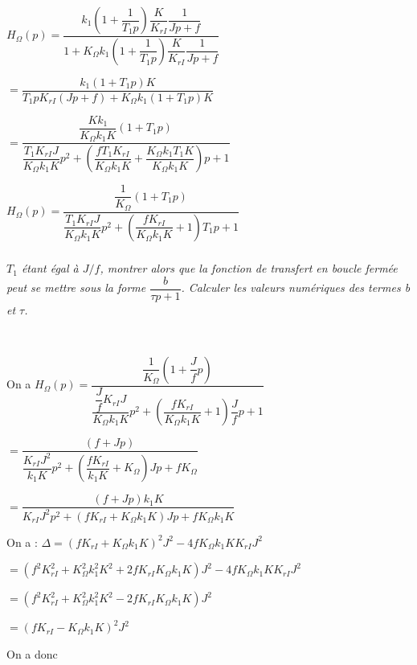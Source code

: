 \documentclass[10pt,fleqn]{article} %
\begin{document}
\begin{multicols}{2}
\ifprof
\begin{corrige}
$H_{\Omega}(p)=\dfrac{k_{1}\left( 1 + \dfrac{1}{T_{1}p} \right)\dfrac{K}{K_{rI}}\dfrac{1}{Jp+f}}{1+ K_{\Omega}k_{1}\left( 1 +\dfrac{1}{T_{1}p} \right)\dfrac{K}{K_{rI}}\dfrac{1}{Jp+f}}$

$=\dfrac{k_{1}\left( 1 + T_{1}p \right)K}{T_{1}p K_{rI}\left(Jp+f\right) + K_{\Omega}k_{1}\left(1+ T_{1}p\right) K}$

$=\dfrac{\dfrac{Kk_{1}}{K_{\Omega}k_{1}K}\left( 1 + T_{1}p \right)}{\dfrac{T_{1} K_{rI}J}{K_{\Omega}k_{1}K}p^2+\left(\dfrac{fT_{1} K_{rI}}{K_{\Omega}k_{1}K}+\dfrac{K_{\Omega}k_{1}T_{1}K}{K_{\Omega}k_{1}K}\right)p + 1 }$


$H_{\Omega}(p)=\dfrac{\dfrac{1}{K_{\Omega}}\left( 1 + T_{1}p \right)}{\dfrac{T_{1} K_{rI}J}{K_{\Omega}k_{1}K}p^2+\left(\dfrac{f K_{rI}}{K_{\Omega}k_{1}K}+1\right)T_{1}p + 1 }$

\end{corrige}
\else
\fi

\subparagraph{}\textit{$T_1$ étant égal à $J/f$, montrer alors que
  la fonction de transfert en boucle fermée peut se mettre sous la forme
  \(\dfrac{b}{\tau p + 1}\). Calculer les valeurs numériques des termes
  \emph{b} et \emph{$\tau$}.}

\ifprof
\begin{corrige}~\\

\footnotesize

On a 
$H_{\Omega}(p)=\dfrac{\dfrac{1}{K_{\Omega}}\left( 1 + \dfrac{J}{f}p \right)}{\dfrac{\dfrac{J}{f} K_{rI}J}{K_{\Omega}k_{1}K}p^2+\left(\dfrac{f K_{rI}}{K_{\Omega}k_{1}K}+1\right)\dfrac{J}{f}p + 1 }$

$=\dfrac{\left( f + Jp \right)}{\dfrac{ K_{rI}J^2}{k_{1}K}p^2+\left(\dfrac{f K_{rI}}{k_{1}K}+K_{\Omega}\right)Jp + fK_{\Omega}}$

$=\dfrac{\left( f + Jp \right)k_{1}K}{ K_{rI}J^2p^2+\left(f K_{rI}+K_{\Omega}k_{1}K\right)Jp + fK_{\Omega}k_{1}K}$


On a :
$\Delta =\left(f K_{rI}+K_{\Omega}k_{1}K\right)^2J^2 -4 fK_{\Omega}k_{1}KK_{rI}J^2 $ 

$=\left(f^2 K_{rI}^2+K_{\Omega}^2k_{1}^2K^2+2f K_{rI}K_{\Omega}k_{1}K\right)J^2 -4 fK_{\Omega}k_{1}KK_{rI}J^2 $

$=\left(f^2 K_{rI}^2+K_{\Omega}^2k_{1}^2K^2-2f K_{rI}K_{\Omega}k_{1}K\right)J^2  $

$=\left(f K_{rI}-K_{\Omega}k_{1}K\right)^2J^2  $

On a donc 


\end{corrige}
\end{multicols}
\end{document}

